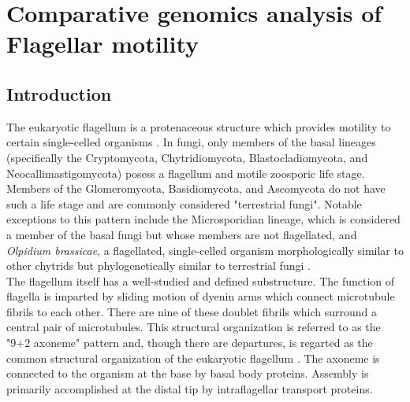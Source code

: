 \chapter{Comparative genomics analysis of Flagellar motility}
\label{app:Flagella}
\section{Introduction}
The eukaryotic flagellum is a protenaceous structure which provides motility to certain single-celled organisms \cite{Haimo1981}. In fungi, only members of the basal lineages (specifically the Cryptomycota, Chytridiomycota, Blastocladiomycota, and Neocallimastigomycota) posess a flagellum and motile zoosporic life stage. Members of the Glomeromycota, Basidiomycota, and Ascomycota do not have such a life stage \cite{Stajich2009} and are commonly considered "terrestrial fungi". Notable exceptions to this pattern include the Microsporidian lineage, which is considered a member of the basal fungi but whose members are not flagellated, and \textit{Olpidium brassicae}, a flagellated, single-celled organism morphologically similar to other chytrids but phylogenetically similar to terrestrial fungi \cite{Sekimoto2011}. \\
\indent The flagellum itself has a well-studied and defined substructure. The function of flagella is imparted by sliding motion of dyenin arms which connect microtubule fibrils to each other. There are nine of these doublet fibrils which surround a central pair of microtubules. This structural organization is referred to as the "9+2 axoneme" pattern and, though there are departures, is regarted as the common structural organization of the eukaryotic flagellum \cite{Haimo1981}. The axoneme is connected to the organism at the base by basal body proteins. Assembly is primarily accomplished at the distal tip by intraflagellar transport proteins.\\
